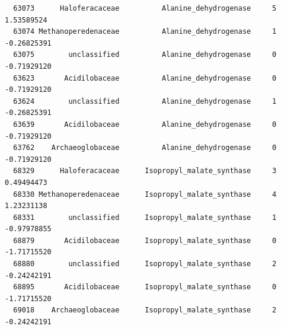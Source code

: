 \documentclass[12pt,twoside]{reedthesis}
\begin{document}
\begin{verbatim}
  63073      Haloferacaceae          Alanine_dehydrogenase     5  1.53589524
  63074 Methanoperedenaceae          Alanine_dehydrogenase     1 -0.26825391
  63075        unclassified          Alanine_dehydrogenase     0 -0.71929120
  63623       Acidilobaceae          Alanine_dehydrogenase     0 -0.71929120
  63624        unclassified          Alanine_dehydrogenase     1 -0.26825391
  63639       Acidilobaceae          Alanine_dehydrogenase     0 -0.71929120
  63762    Archaeoglobaceae          Alanine_dehydrogenase     0 -0.71929120
  68329      Haloferacaceae      Isopropyl_malate_synthase     3  0.49494473
  68330 Methanoperedenaceae      Isopropyl_malate_synthase     4  1.23231138
  68331        unclassified      Isopropyl_malate_synthase     1 -0.97978855
  68879       Acidilobaceae      Isopropyl_malate_synthase     0 -1.71715520
  68880        unclassified      Isopropyl_malate_synthase     2 -0.24242191
  68895       Acidilobaceae      Isopropyl_malate_synthase     0 -1.71715520
  69018    Archaeoglobaceae      Isopropyl_malate_synthase     2 -0.24242191
  \end{verbatim}
  
  \begin{Shaded}
  \end{Shaded}
  
\end{document}
